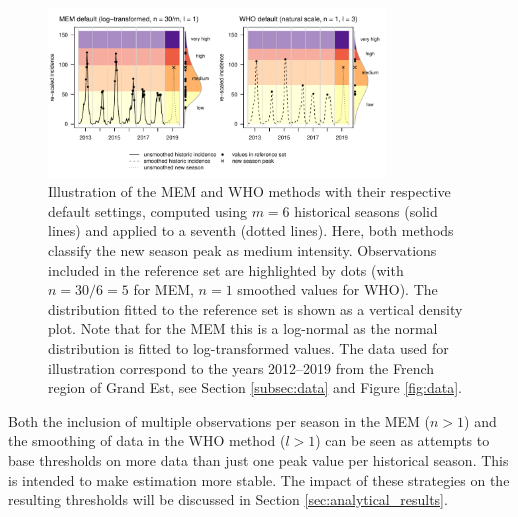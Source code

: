 \documentclass[12pt]{article}
\begin{document}
\begin{figure}
\begin{center}
\includegraphics[width = 0.8\textwidth]{figure/illustration_mem_who.pdf}
\end{center}
\caption{Illustration of the MEM and WHO methods with their respective default settings, computed using $m = 6$ historical seasons (solid lines) and applied to a seventh (dotted lines). Here, both methods classify the new season peak as medium intensity. Observations included in the reference set are highlighted by dots (with $n = 30/6 = 5$ for MEM, $n = 1$ smoothed values for WHO). The distribution fitted to the reference set is shown as a vertical density plot. Note that for the MEM this is a log-normal as the normal distribution is fitted to log-transformed values. The data used for illustration correspond to the years 2012--2019 from the French region of Grand Est, see Section \ref{subsec:data} and Figure \ref{fig:data}.}
\label{fig:illustration}
\end{figure}


Both the inclusion of multiple observations per season in the MEM ($n > 1$) and the smoothing of data in the WHO method ($l > 1$) can be seen as attempts to base thresholds on more data than just one peak value per historical season. This is intended to make estimation more stable. The impact of these strategies on the resulting thresholds will be discussed in Section \ref{sec:analytical_results}.



\end{document}

